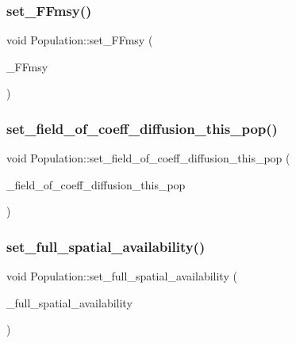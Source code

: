 \mbox{\label{class_population_ab0aa3da4fff8dfce23d6c39ddd5c0cee}} 
\subsubsection{\texorpdfstring{set\_FFmsy()}{set\_FFmsy()}}
{\footnotesize\ttfamily void Population\+::set\+\_\+\+F\+Fmsy (\begin{DoxyParamCaption}\item[{const vector$<$ double $>$ \&}]{\+\_\+\+F\+Fmsy }\end{DoxyParamCaption})}

\mbox{\label{class_population_a1db1433c65156a90fc910bb11e5cdcca}} 
\subsubsection{\texorpdfstring{set\_field\_of\_coeff\_diffusion\_this\_pop()}{set\_field\_of\_coeff\_diffusion\_this\_pop()}}
{\footnotesize\ttfamily void Population\+::set\+\_\+field\+\_\+of\+\_\+coeff\+\_\+diffusion\+\_\+this\+\_\+pop (\begin{DoxyParamCaption}\item[{multimap$<$ \mbox{\hyperlink{classtypes_1_1_node_id}{types\+::\+Node\+Id}}, double $>$}]{\+\_\+field\+\_\+of\+\_\+coeff\+\_\+diffusion\+\_\+this\+\_\+pop }\end{DoxyParamCaption})}

\mbox{\label{class_population_ad994160916721d5d96c33a4db702e90b}} 
\subsubsection{\texorpdfstring{set\_full\_spatial\_availability()}{set\_full\_spatial\_availability()}}
{\footnotesize\ttfamily void Population\+::set\+\_\+full\+\_\+spatial\+\_\+availability (\begin{DoxyParamCaption}\item[{multimap$<$ \mbox{\hyperlink{classtypes_1_1_node_id}{types\+::\+Node\+Id}}, double $>$}]{\+\_\+full\+\_\+spatial\+\_\+availability }\end{DoxyParamCaption})}

